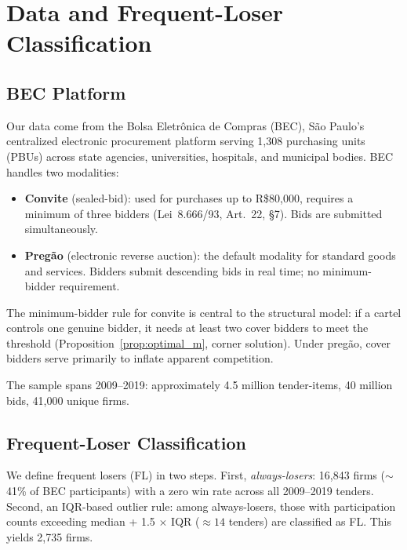 
\section{Data and Frequent-Loser Classification}
\label{sec:data}

\subsection{BEC Platform}
\label{sec:bec}

Our data come from the Bolsa Eletr\^onica de Compras (BEC), S\~ao
Paulo's centralized electronic procurement platform serving 1,308
purchasing units (PBUs) across state agencies, universities, hospitals,
and municipal bodies. BEC handles two modalities:

\begin{itemize}
  \item \textbf{Convite} (sealed-bid): used for purchases up to
    R\$80,000, requires a minimum of three bidders (Lei~8.666/93,
    Art.~22, \S7). Bids are submitted simultaneously.
  \item \textbf{Preg\~ao} (electronic reverse auction): the default
    modality for standard goods and services. Bidders submit descending
    bids in real time; no minimum-bidder requirement.
\end{itemize}

The minimum-bidder rule for convite is central to the structural
model: if a cartel controls one genuine bidder, it needs at least two
cover bidders to meet the threshold
(Proposition~\ref{prop:optimal_m}, corner solution). Under preg\~ao,
cover bidders serve primarily to inflate apparent competition.

The sample spans 2009--2019: approximately 4.5 million tender-items,
40 million bids, 41,000 unique firms.

\subsection{Frequent-Loser Classification}
\label{sec:fl_definition}

We define frequent losers (FL) in two steps. First, \emph{always-losers}:
16,843 firms ($\sim$41\% of BEC participants) with a zero win rate
across all 2009--2019 tenders. Second, an IQR-based outlier rule:
among always-losers, those with participation counts exceeding
median + 1.5 $\times$ IQR ($\approx 14$ tenders) are classified as FL.
This yields 2,735 firms.


